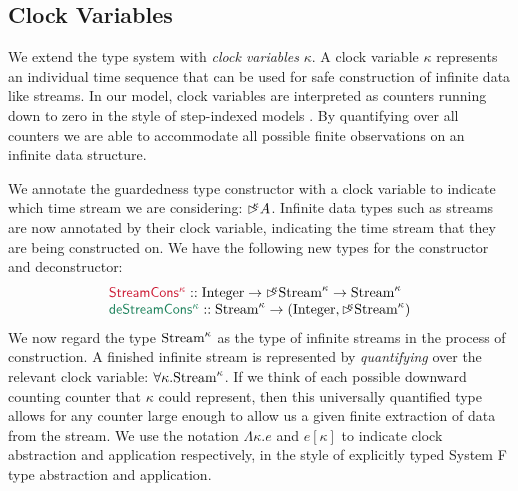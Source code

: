 \subsection{Clock Variables}\label{sec:clock-vars}

We extend the type system with \emph{clock variables} $\kappa$. A
clock variable $\kappa$ represents an individual time sequence that
can be used for safe construction of infinite data like streams. In
our model, clock variables are interpreted as counters running down to
zero in the style of step-indexed models \cite{mcallester-appel}. By
quantifying over all counters we are able to accommodate all possible
finite observations on an infinite data structure.

We annotate the guardedness type constructor with a clock variable to
indicate which time stream we are considering: $\mathord{\rhd\kern-0.4em^{\kappa}}
A$. Infinite data types such as streams are now annotated by their
clock variable, indicating the time stream that they are being
constructed on. We have the following new types for the constructor
and deconstructor:
\begin{displaymath}
  \begin{array}{l}
    \cons{StreamCons$^\kappa$} :: \tyname{Integer} \to \delay\kappa \tyname{Stream}^\kappa \to \tyname{Stream}^\kappa \\
    \elim{deStreamCons$^\kappa$} :: \tyname{Stream}^\kappa \to (\tyname{Integer}, \delay\kappa\tyname{Stream}^\kappa)    
  \end{array}
\end{displaymath}
We now regard the type $\textrm{Stream}^\kappa$ as the type of
infinite streams in the process of construction. A finished infinite
stream is represented by \emph{quantifying} over the relevant clock
variable: $\forall \kappa. \textrm{Stream}^\kappa$. If we think of
each possible downward counting counter that $\kappa$ could represent,
then this universally quantified type allows for any counter large
enough to allow us a given finite extraction of data from the
stream. We use the notation $\Lambda\kappa. e$ and $e[\kappa]$ to
indicate clock abstraction and application respectively, in the style
of explicitly typed System F type abstraction and application.

